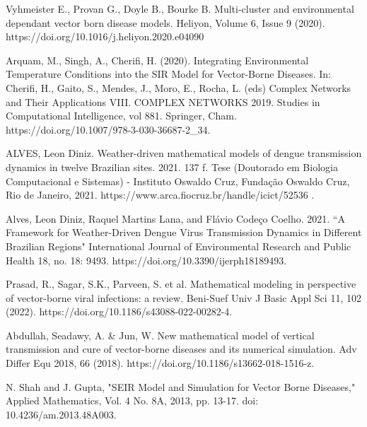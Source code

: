 \documentclass[12pt]{article}
\begin{document}
\noindent [3] Vyhmeister E., Provan G., Doyle B., Bourke B. Multi-cluster and environmental dependant vector born disease models. Heliyon, Volume 6, Issue 9 (2020). https://doi.org/10.1016/j.heliyon.2020.e04090

\noindent [4] Arquam, M., Singh, A., Cherifi, H. (2020). Integrating Environmental Temperature Conditions into the SIR Model for Vector-Borne Diseases. In: Cherifi, H., Gaito, S., Mendes, J., Moro, E., Rocha, L. (eds) Complex Networks and Their Applications VIII. COMPLEX NETWORKS 2019. Studies in Computational Intelligence, vol 881. Springer, Cham. https://doi.org/10.1007/978-3-030-36687-2\_34.

\noindent [5] ALVES, Leon Diniz. Weather-driven mathematical models of dengue transmission dynamics in twelve Brazilian sites. 2021. 137 f. Tese (Doutorado em Biologia Computacional e Sistemas) - Instituto Oswaldo Cruz, Fundação Oswaldo Cruz, Rio de Janeiro, 2021. https://www.arca.fiocruz.br/handle/icict/52536	.

\noindent [6] Alves, Leon Diniz, Raquel Martins Lana, and Flávio Codeço Coelho. 2021. ``A Framework for Weather-Driven Dengue Virus Transmission Dynamics in Different Brazilian Regions" International Journal of Environmental Research and Public Health 18, no. 18: 9493. https://doi.org/10.3390/ijerph18189493.

\noindent [7] Prasad, R., Sagar, S.K., Parveen, S. et al. Mathematical modeling in perspective of vector-borne viral infections: a review. Beni-Suef Univ J Basic Appl Sci 11, 102 (2022). https://doi.org/10.1186/s43088-022-00282-4.

\noindent [8] Abdullah, Seadawy, A. & Jun, W. New mathematical model of vertical transmission and cure of vector-borne diseases and its numerical simulation. Adv Differ Equ 2018, 66 (2018). 
https://doi.org/10.1186/s13662-018-1516-z.

\noindent [9] N. Shah and J. Gupta, "SEIR Model and Simulation for Vector Borne Diseases," Applied Mathematics, Vol. 4 No. 8A, 2013, pp. 13-17. doi: 10.4236/am.2013.48A003.
\end{document}
